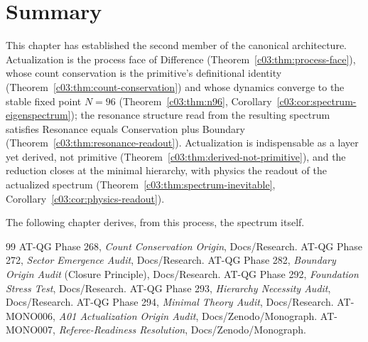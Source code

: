 \section{Summary}
\label{c03:sec:actualization-summary}

This chapter has established the second member of the canonical architecture. Actualization
is the process face of Difference (Theorem~\ref{c03:thm:process-face}), whose count
conservation is the primitive's definitional identity (Theorem~\ref{c03:thm:count-conservation})
and whose dynamics converge to the stable fixed point $N=96$
(Theorem~\ref{c03:thm:n96}, Corollary~\ref{c03:cor:spectrum-eigenspectrum}); the resonance
structure read from the resulting spectrum satisfies Resonance equals Conservation plus
Boundary (Theorem~\ref{c03:thm:resonance-readout}). Actualization is indispensable as a layer
yet derived, not primitive (Theorem~\ref{c03:thm:derived-not-primitive}), and the reduction
closes at the minimal hierarchy, with physics the readout of the actualized spectrum
(Theorem~\ref{c03:thm:spectrum-inevitable}, Corollary~\ref{c03:cor:physics-readout}).

The following chapter derives, from this process, the spectrum itself.

\begin{thebibliography}{99}
 AT-QG Phase 268, \emph{Count Conservation Origin}, Docs/Research.
 AT-QG Phase 272, \emph{Sector Emergence Audit}, Docs/Research.
 AT-QG Phase 282, \emph{Boundary Origin Audit} (Closure Principle), Docs/Research.
 AT-QG Phase 292, \emph{Foundation Stress Test}, Docs/Research.
 AT-QG Phase 293, \emph{Hierarchy Necessity Audit}, Docs/Research.
 AT-QG Phase 294, \emph{Minimal Theory Audit}, Docs/Research.
 AT-MONO006, \emph{A01 Actualization Origin Audit}, Docs/Zenodo/Monograph.
 AT-MONO007, \emph{Referee-Readiness Resolution}, Docs/Zenodo/Monograph.
\end{thebibliography}